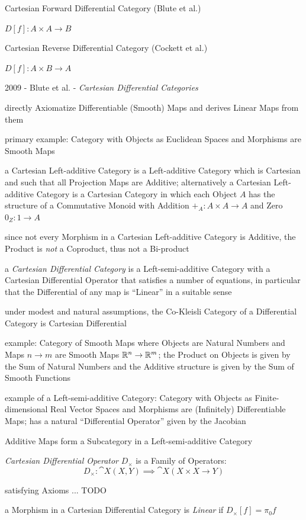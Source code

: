 Cartesian Forward Differential Category (Blute et al.)

$D[f] : A \times A \to B$

Cartesian Reverse Differential Category (Cockett et al.)

$D[f] : A \times B \to A$

2009 - Blute et al. - \emph{Cartesian Differential Categories}

directly Axiomatize Differentiable (Smooth) Maps and derives Linear Maps from
them

primary example: Category with Objects as Euclidean Spaces and Morphisms are
Smooth Maps

a Cartesian Left-additive Category is a Left-additive Category which is
Cartesian and such that all Projection Maps are Additive; alternatively a
Cartesian Left-additive Category is a Cartesian Category in which each Object
$A$ has the structure of a Commutative Monoid with Addition
$+_A : A \times A \to A$ and Zero $0_Z : 1 \to A$

since not every Morphism in a Cartesian Left-additive Category is Additive, the
Product is \emph{not} a Coproduct, thus not a Bi-product

a \emph{Cartesian Differential Category} is a Left-semi-additive Category with a
Cartesian Differential Operator that satisfies a number of equations, in
particular that the Differential of any map is ``Linear'' in a suitable sense

under modest and natural assumptions, the Co-Kleisli Category of a Differential
Category is Cartesian Differential

example: Category of Smooth Maps where Objects are Natural Numbers and Maps
$n \to m$ are Smooth Maps $\mathbb{R}^n \to \mathbb{R}^m$; the Product on Objects is
given by the Sum of Natural Numbers and the Additive structure is given by the
Sum of Smooth Functions

example of a Left-semi-additive Category: Category with Objects as
Finite-dimensional Real Vector Spaces and Morphisms are (Infinitely)
Differentiable Maps; has a natural ``Differential Operator'' given by the
Jacobian

Additive Maps form a Subcategory in a Left-semi-additive Category

\emph{Cartesian Differential Operator} $D_\times$ is a Family of Operators:
\[
  D_\times : \cat{X}(X,Y) \implies \cat{X}(X \times X \to Y)
\]

satisfying Axioms ... TODO

a Morphism in a Cartesian Differential Category is \emph{Linear} if
$D_\times[f] = \pi_0 f$

